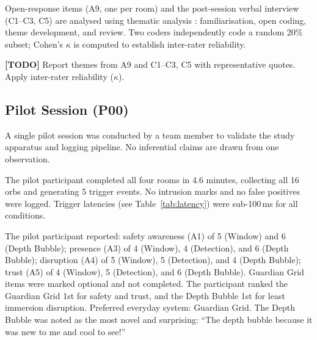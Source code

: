 \documentclass{styling/vgtc} %
\begin{document}
Open-response items (A9, one per room) and the post-session verbal
interview (C1--C3, C5) are analysed using thematic analysis
\cite{braun2006thematic}: familiarisation, open coding, theme
development, and review. Two coders independently code a random
20\% subset; Cohen's $\kappa$ is computed to establish inter-rater
reliability.

\textbf{[TODO]} Report themes from A9 and C1--C3, C5 with
representative quotes. Apply inter-rater reliability ($\kappa$).


\subsection{Pilot Session (P00)}
\label{sec:pilot}

A single pilot session was conducted by a team member to validate the
study apparatus and logging pipeline. No inferential claims are drawn
from one observation.

The pilot participant completed all four rooms in 4.6 minutes,
collecting all 16 orbs and generating 5 trigger events. No intrusion
marks and no false positives were logged. Trigger latencies (see
Table~\ref{tab:latency}) were sub-100\,ms for all conditions.

The pilot participant reported: safety awareness (A1) of 5 (Window)
and 6 (Depth Bubble); presence (A3) of 4 (Window), 4 (Detection), and
6 (Depth Bubble); disruption (A4) of 5 (Window), 5 (Detection), and 4
(Depth Bubble); trust (A5) of 4 (Window), 5 (Detection), and 6 (Depth
Bubble). Guardian Grid items were marked optional and not completed.
The participant ranked the Guardian Grid 1st for safety and trust, and
the Depth Bubble 1st for least immersion disruption. Preferred everyday
system: Guardian Grid. The Depth Bubble was noted as the most novel and
surprising: ``The depth bubble because it was new to me and cool to see!''
\end{document}
